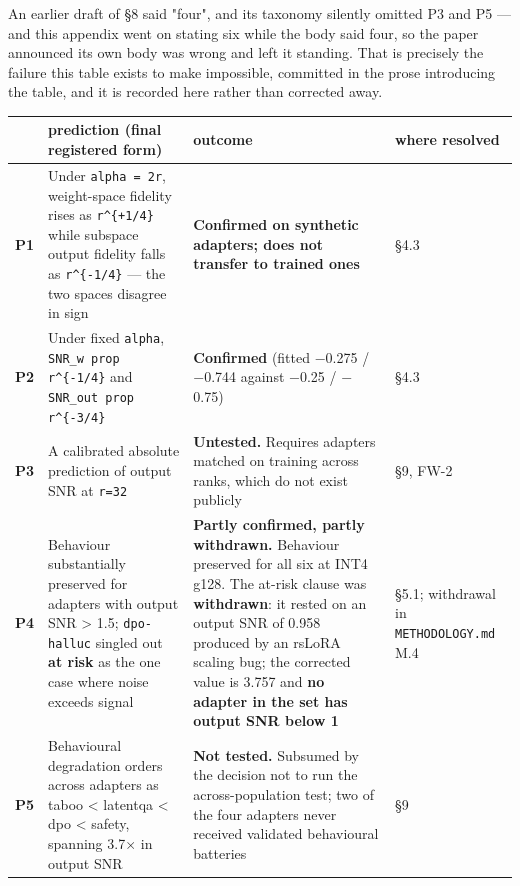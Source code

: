 An earlier draft of \S{}8 said "four", and its taxonomy silently omitted P3 and P5 --- and this appendix went on stating six while the body said four, so the paper announced its own body was wrong and left it standing. That is precisely the failure this table exists to make impossible, committed in the prose introducing the table, and it is recorded here rather than corrected away.

\begin{table}[t]
\centering\scriptsize
\begin{tabularx}{\textwidth}{l>{\hsize=0.905\hsize\raggedright\arraybackslash}X>{\hsize=1.672\hsize\raggedright\arraybackslash}X>{\hsize=0.423\hsize\raggedright\arraybackslash}X}
\toprule
 & prediction (final registered form) & outcome & where resolved \\
\midrule
\textbf{P1} & Under \texttt{alpha = 2r}, weight-space fidelity rises as \texttt{r\textasciicircum{}\{+1/\allowbreak{}4\}} while subspace output fidelity falls as \texttt{r\textasciicircum{}\{-\allowbreak{}1/\allowbreak{}4\}} --- the two spaces disagree in sign & \textbf{Confirmed on synthetic adapters; does not transfer to trained ones} & \S{}4.3 \\
\textbf{P2} & Under fixed \texttt{alpha}, \texttt{SNR\_\allowbreak{}w prop r\textasciicircum{}\{-\allowbreak{}1/\allowbreak{}4\}} and \texttt{SNR\_\allowbreak{}out prop r\textasciicircum{}\{-\allowbreak{}3/\allowbreak{}4\}} & \textbf{Confirmed} (fitted $-$0.275 / $-$0.744 against $-$0.25 / $-$0.75) & \S{}4.3 \\
\textbf{P3} & A calibrated absolute prediction of output SNR at \texttt{r=32} & \textbf{Untested.} Requires adapters matched on training across ranks, which do not exist publicly & \S{}9, FW-2 \\
\textbf{P4} & Behaviour substantially preserved for adapters with output SNR > 1.5; \texttt{dpo-\allowbreak{}halluc} singled out \textbf{at risk} as the one case where noise exceeds signal & \textbf{Partly confirmed, partly withdrawn.} Behaviour preserved for all six at INT4 g128. The at-risk clause was \textbf{withdrawn}: it rested on an output SNR of 0.958 produced by an rsLoRA scaling bug; the corrected value is 3.757 and \textbf{no adapter in the set has output SNR below 1} & \S{}5.1; withdrawal in \texttt{METHODOLOGY.\allowbreak{}md} M.4 \\
\textbf{P5} & Behavioural degradation orders across adapters as taboo < latentqa < dpo < safety, spanning 3.7$\times$ in output SNR & \textbf{Not tested.} Subsumed by the decision not to run the across-population test; two of the four adapters never received validated behavioural batteries & \S{}9 \\

\end{tabularx}
\end{table}

